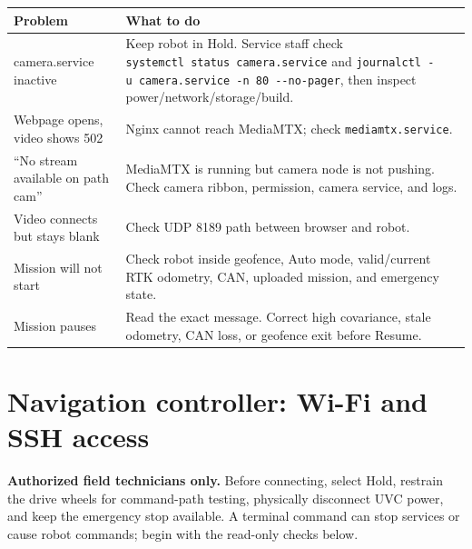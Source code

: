\documentclass[
  10pt,
  letterpaper,
  openany]{report}
\newcounter{none} %
\begin{document}
{\def\LTcaptype{none} %
\begin{longtable}[]{@{}
  >{\raggedright\arraybackslash}p{}
  >{\raggedright\arraybackslash}p{}@{}}
\toprule\noalign{}
\begin{minipage}[b]{\linewidth}\raggedright
Problem
\end{minipage} & \begin{minipage}[b]{\linewidth}\raggedright
What to do
\end{minipage} \\
\midrule\noalign{}
\endhead
\bottomrule\noalign{}
\endlastfoot
camera.service inactive & Keep robot in Hold. Service staff check
\texttt{systemctl\ status\ camera.service} and
\texttt{journalctl\ -u\ camera.service\ -n\ 80\ -\/-no-pager}, then
inspect power/network/storage/build. \\
Webpage opens, video shows 502 & Nginx cannot reach MediaMTX; check
\texttt{mediamtx.service}. \\
``No stream available on path cam'' & MediaMTX is running but camera
node is not pushing. Check camera ribbon, permission, camera service,
and logs. \\
Video connects but stays blank & Check UDP 8189 path between browser and
robot. \\
Mission will not start & Check robot inside geofence, Auto mode,
valid/current RTK odometry, CAN, uploaded mission, and emergency
state. \\
Mission pauses & Read the exact message. Correct high covariance, stale
odometry, CAN loss, or geofence exit before Resume. \\
\end{longtable}
}

\protect{}\label{nav-technician-access}
\section{Navigation controller: Wi-Fi and SSH
access}\label{navigation-controller-wi-fi-and-ssh-access}

\begin{manualwarning}

\textbf{Authorized field technicians only.} Before connecting, select
Hold, restrain the drive wheels for command-path testing, physically
disconnect UVC power, and keep the emergency stop available. A terminal
command can stop services or cause robot commands; begin with the
read-only checks below.

\end{manualwarning}
\end{document}
